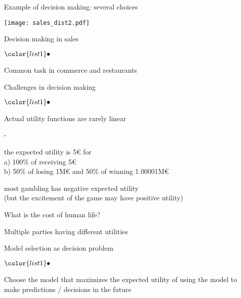 \documentclass[t]{beamer}
\newenvironment{list1}{
   \begin{list}{$\color{list1}\bullet$}{\itemsep=6pt}}{
  \end{list}}
\newenvironment{list2}{
  \begin{list}{-}{\baselineskip=12pt\itemsep=2pt}}{
  \end{list}}
\begin{document}
\begin{frame}{Example of decision making: several choices}

  {\texttt{[image: sales\_dist2.pdf]}}\\
  
\end{frame}  

\begin{frame}{Decision making in sales}

  \begin{list1}
    \item Common task in commerce and restaurants
  \end{list1}
  
\end{frame}  


\begin{frame}{Challenges in decision making}

  \begin{list1}
  \item Actual utility functions are rarely linear
    \begin{list2}
    \item<2-> the expected utility is 5€ for\\
      a) 100\% of receiving 5€\\
      b) 50\% of losing 1M€ and 50\% of winning 1.00001M€
    \item<3-> most gambling has negative expected utility\\
      (but the excitement of the game may have positive utility)
    \end{list2}
  \item<4-> What is the cost of human life?
  \item<5-> Multiple parties having different utilities
  \end{list1}
  
\end{frame}

\begin{frame}
  
  {\Large\color{navyblue} Model selection as decision problem}

  \begin{list1}
  \item Choose the model that maximizes the expected utility of using
    the model to make predictions / decisions in the future
  \end{list1}

\end{frame}
\end{document}
